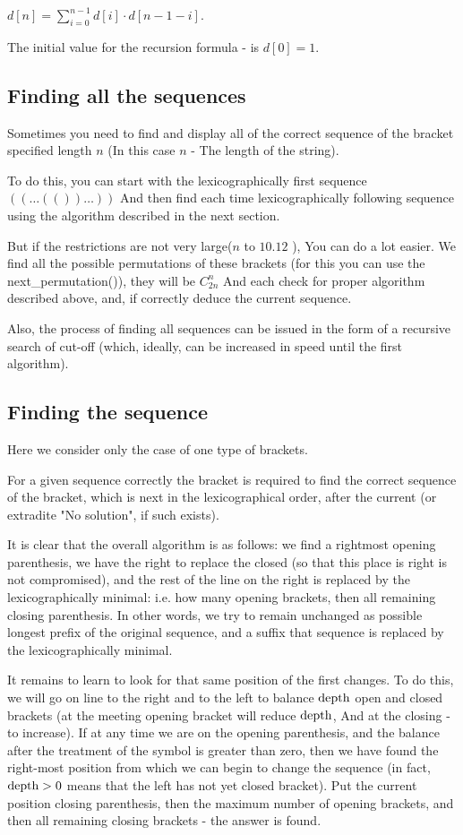 $d [n] = \sum_ {i = 0} ^ {n-1} d [i] \cdot d [n-1-i].$

The initial value for the recursion formula - is $d [0] = 1$.

\subsection{ Finding all the sequences }

Sometimes you need to find and display all of the correct sequence of the bracket specified length $n$ (In this case $n$ - The length of the string).

To do this, you can start with the lexicographically first sequence $((\ldots (()) \ldots))$ And then find each time lexicographically following sequence using the algorithm described in the next section.

But if the restrictions are not very large($n$ to $10.12$ ), You can do a lot easier. We find all the possible permutations of these brackets (for this you can use the next\_permutation()), they will be $C_ {2n} ^ n$ And each check for proper algorithm described above, and, if correctly deduce the current sequence.

Also, the process of finding all sequences can be issued in the form of a recursive search of cut-off (which, ideally, can be increased in speed until the first algorithm).

\subsection{ Finding the sequence }

Here we consider only the case of one type of brackets.

For a given sequence correctly the bracket is required to find the correct sequence of the bracket, which is next in the lexicographical order, after the current (or extradite "No solution", if such exists).

It is clear that the overall algorithm is as follows: we find a rightmost opening parenthesis, we have the right to replace the closed (so that this place is right is not compromised), and the rest of the line on the right is replaced by the lexicographically minimal: i.e. how many opening brackets, then all remaining closing parenthesis. In other words, we try to remain unchanged as possible longest prefix of the original sequence, and a suffix that sequence is replaced by the lexicographically minimal.

It remains to learn to look for that same position of the first changes. To do this, we will go on line to the right and to the left to balance $\rm depth$ open and closed brackets (at the meeting opening bracket will reduce $\rm depth$, And at the closing - to increase). If at any time we are on the opening parenthesis, and the balance after the treatment of the symbol is greater than zero, then we have found the right-most position from which we can begin to change the sequence (in fact, $\rm depth> 0$ means that the left has not yet closed bracket). Put the current position closing parenthesis, then the maximum number of opening brackets, and then all remaining closing brackets - the answer is found.

